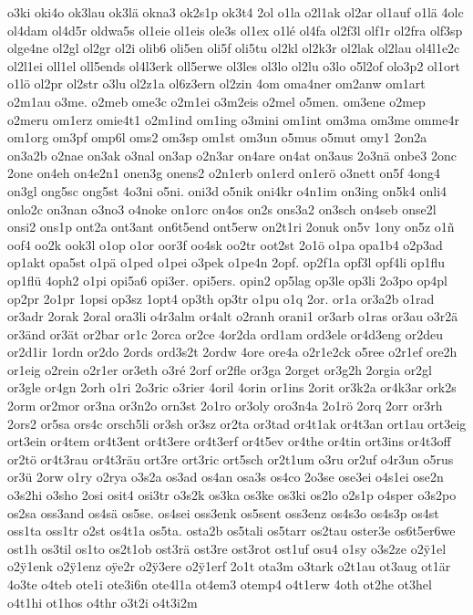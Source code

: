 {o3ki
oki4o
ok3lau
ok3lä
okna3
ok2s1p
ok3t4
2ol
o1la
o2l1ak
ol2ar
ol1auf
o1lä
4olc
ol4dam
ol4d5r
oldwa5s
ol1eie
ol1eis
ole3s
ol1ex
o1lé
ol4fa
ol2f3l
olf1r
ol2fra
olf3sp
olge4ne
ol2gl
ol2gr
ol2i
olib6
oli5en
oli5f
oli5tu
ol2kl
ol2k3r
ol2lak
ol2lau
ol4l1e2c
ol2l1ei
oll1el
oll5ends
ol4l3erk
oll5erwe
ol3les
ol3lo
ol2lu
o3lo
o5l2of
olo3p2
ol1ort
o1lö
ol2pr
ol2str
o3lu
ol2z1a
ol6z3ern
ol2zin
4om
oma4ner
om2anw
om1art
o2m1au
o3me.
o2meb
ome3c
o2m1ei
o3m2eis
o2mel
o5men.
om3ene
o2mep
o2meru
om1erz
omie4t1
o2m1ind
om1ing
o3mini
om1int
om3ma
om3me
omme4r
om1org
om3pf
omp6l
oms2
om3sp
om1st
om3un
o5mus
o5mut
omy1
2on2a
on3a2b
o2nae
on3ak
o3nal
on3ap
o2n3ar
on4are
on4at
on3aus
2o3nä
onbe3
2onc
2one
on4eh
on4e2n1
onen3g
onens2
o2n1erb
on1erd
on1erö
o3nett
on5f
4ong4
on3gl
ong5sc
ong5st
4o3ni
o5ni.
oni3d
o5nik
oni4kr
o4n1im
on3ing
on5k4
onli4
onlo2c
on3nan
o3no3
o4noke
on1orc
on4os
on2s
ons3a2
on3sch
on4seb
onse2l
onsi2
ons1p
ont2a
ont3ant
on6t5end
ont5erw
on2t1ri
2onuk
on5v
1ony
on5z
o1ñ
oof4
oo2k
ook3l
o1op
o1or
oor3f
oo4sk
oo2tr
oot2st
2o1ö
o1pa
opa1b4
o2p3ad
op1akt
opa5st
o1pä
o1ped
o1pei
o3pek
o1pe4n
2opf.
op2f1a
opf3l
opf4li
op1flu
op1flü
4oph2
o1pi
opi5a6
opi3er.
opi5ers.
opin2
op5lag
op3le
op3li
2o3po
op4pl
op2pr
2o1pr
1opsi
op3sz
1opt4
op3th
op3tr
o1pu
o1q
2or.
or1a
or3a2b
o1rad
or3adr
2orak
2oral
ora3li
o4r3alm
or4alt
o2ranh
orani1
or3arb
o1ras
or3au
o3r2ä
or3änd
or3ät
or2bar
or1c
2orca
or2ce
4or2da
ord1am
ord3ele
or4d3eng
or2deu
or2d1ir
1ordn
or2do
2ords
ord3s2t
2ordw
4ore
ore4a
o2r1e2ck
o5ree
o2r1ef
ore2h
or1eig
o2rein
o2r1er
or3eth
o3ré
2orf
or2fle
or3ga
2orget
or3g2h
2orgia
or2gl
or3gle
or4gn
2orh
o1ri
2o3ric
o3rier
4oril
4orin
or1ins
2orit
or3k2a
or4k3ar
ork2s
2orm
or2mor
or3na
or3n2o
orn3st
2o1ro
or3oly
oro3n4a
2o1rö
2orq
2orr
or3rh
2ors2
or5sa
ors4c
orsch5li
or3sh
or3sz
or2ta
or3tad
or4t1ak
or4t3an
ort1au
ort3eig
ort3ein
or4tem
or4t3ent
or4t3ere
or4t3erf
or4t5ev
or4the
or4tin
ort3ins
or4t3off
or2tö
or4t3rau
or4t3räu
ort3re
ort3ric
ort5sch
or2t1um
o3ru
or2uf
o4r3un
o5rus
or3ü
2orw
o1ry
o2rya
o3s2a
os3ad
os4an
osa3s
os4co
2o3se
ose3ei
o4s1ei
ose2n
o3s2hi
o3sho
2osi
osit4
osi3tr
o3s2k
os3ka
os3ke
os3ki
os2lo
o2s1p
o4sper
o3s2po
os2sa
oss3and
os4sä
os5se.
os4sei
oss3enk
os5sent
oss3enz
os4s3o
os4s3p
os4st
oss1ta
oss1tr
o2st
os4t1a
os5ta.
osta2b
os5tali
os5tarr
os2tau
oster3e
os6t5er6we
ost1h
os3til
os1to
os2t1ob
ost3rä
ost3re
ost3rot
ost1uf
osu4
o1sy
o3s2ze
o2^^ff1el
o2^^ff1enk
o2^^ff1enz
o^^ffe2r
o2^^ff3ere
o2^^ff1erf
2o1t
ota3m
o3tark
o2t1au
ot3aug
ot1är
4o3te
o4teb
ote1i
ote3i6n
ote4l1a
ot4em3
otemp4
o4t1erw
4oth
ot2he
ot3hel
o4t1hi
ot1hos
o4thr
o3t2i
o4t3i2m
}
